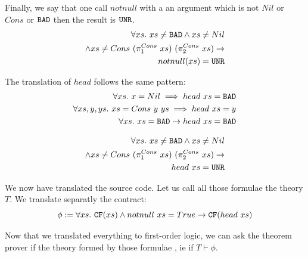\documentclass[preprint]{sigplanconf}
\begin{document}
Finally, we say that one call $notnull$ with a an argument which is
not $Nil$ or $Cons$ or $\texttt{BAD}$ then the result is $\texttt{UNR}$.
\begin{align}
  \label{unrnotnull}
  \forall xs.~xs \neq \texttt{BAD} \land xs \neq Nil  \notag \\
  \land xs \neq Cons~(\pi_{1}^{Cons}~xs)~(\pi_{2}^{Cons}~xs) \to  \notag \\
  notnull(xs) = \texttt{UNR} 
\end{align}

The translation of $head$ follows the same pattern:
\begin{align}
  \forall xs.~ x=Nil \implies head~xs = \texttt{BAD} \notag\\
  \forall xs,y,ys.~ xs=Cons~y~ys \implies head~xs = y     \label{defhead} \\
    \forall xs.~xs=\texttt{BAD} \to head~xs = \texttt{BAD} \notag
\end{align}

\begin{align*}
 \forall xs.~xs \neq \texttt{BAD} \land xs \neq Nil \notag \\
 \land xs \neq Cons~(\pi_{1}^{Cons}~xs)~(\pi_{2}^{Cons}~xs) \to  \notag \\
 head~xs = \texttt{UNR}
\end{align*}

We now have translated the source code. Let us call all those formulae
the theory $T$. We translate separatly the contract:
\begin{equation*}
  \phi := \forall xs.~\texttt{CF}(xs) \land notnull~xs = True \to \texttt{CF}(head~xs) 
\end{equation*}

Now that we translated everything to first-order logic, we can ask the
theorem prover if the theory formed by those formulae , ie if $T \vdash \phi$.
\end{document}
